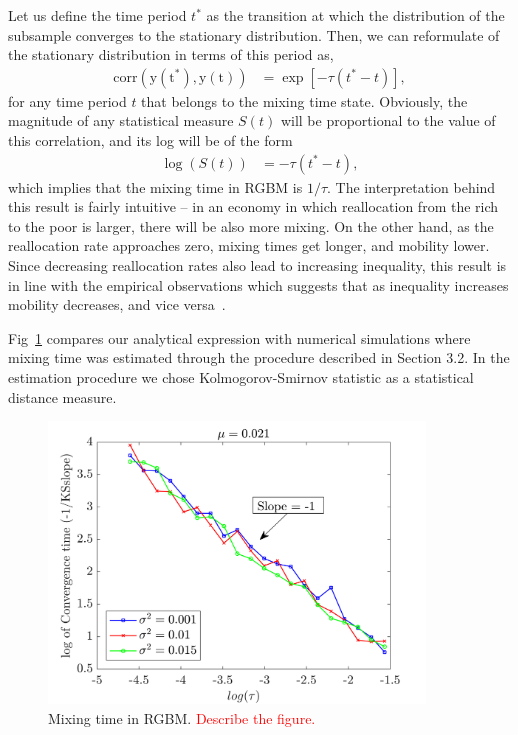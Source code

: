 \documentclass[11pt]{article}
\numberwithin{equation}{section}
\begin{document}
Let us define the time period $t^*$ as the transition at which the distribution of the subsample converges to the stationary distribution. Then, we can reformulate of the stationary distribution in terms of this period as,
\begin{align*}
    \mathrm{corr(y(t^*), y(t))} &= \exp\left[ -\tau (t^* -t)\right],
\end{align*}
for any time period $t$ that belongs to the mixing time state. Obviously, the magnitude of any statistical measure $S(t)$ will be proportional to the value of this correlation, and its log will be of the form
\begin{align}
    \log (S(t)) &=  - \tau (t^*-t),
\end{align}
which implies that the mixing time in RGBM is $1/\tau$. The interpretation behind this result is fairly intuitive -- in an economy in which reallocation from the rich to the poor is larger, there will be also more mixing. On the other  hand, as the reallocation rate approaches zero, mixing times get longer, and mobility lower. Since decreasing reallocation rates also lead to increasing inequality, this result is in line with the empirical observations which suggests that as inequality increases mobility decreases, and vice versa~\citep{corak2013}.

Fig~\ref{fig:rgbm-mixing-time} compares our analytical expression with numerical simulations where mixing time was estimated through the procedure described in Section 3.2. In the estimation procedure we chose Kolmogorov-Smirnov statistic as a statistical distance measure.
\begin{figure}[t!]
\includegraphics[width=10cm]{figs/fig_mixing_time_rgbm.png}
\caption{Mixing time in RGBM. \textcolor{red}{Describe the figure.}\label{fig:rgbm-mixing-time}}
\end{figure}
\end{document}

